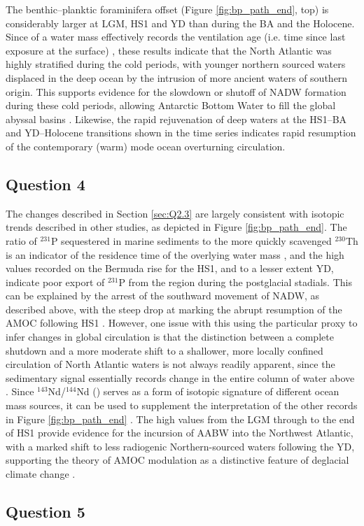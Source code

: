 The benthic--planktic foraminifera \fC{} offset (Figure \ref{fig:bp_path_end}, top) is considerably larger at LGM, HS1 and YD than during the BA and the Holocene.
Since \BP{} of a water mass effectively records the ventilation age (i.e. time since last exposure at the surface) \parencite{lynch2014tracers}, these results indicate that the North Atlantic was highly stratified during the cold periods, with younger northern sourced waters displaced in the deep ocean by the intrusion of more ancient waters of southern origin.
This supports evidence for the slowdown or shutoff of NADW formation during these cold periods, allowing Antarctic Bottom Water to fill the global abyssal basins \parencite{boyle1985comparison, bard1994north, thornalley2011deglacial}.
Likewise, the rapid rejuvenation of deep waters at the HS1--BA and YD--Holocene transitions shown in the \BP{} time series indicates rapid resumption of the contemporary (warm) mode ocean overturning circulation.

\subsection{Question 4}
\label{sec:Q2.4}
The \BP{} changes described in Section \ref{sec:Q2.3} are largely consistent with isotopic trends described in other studies, as depicted in Figure \ref{fig:bp_path_end}.
The ratio of $^{231}$P sequestered in marine sediments to the more quickly scavenged $^{230}$Th is an indicator of the residence time of the overlying water mass \parencite{lynch2014tracers}, and the high values recorded on the Bermuda rise for the HS1, and to a lesser extent YD, indicate poor export of $^{231}$P from the region during the postglacial stadials.
This can be explained by the arrest of the southward movement of NADW, as described above, with the steep \PaTh{} drop at  marking the abrupt resumption of the AMOC following HS1 \parencite{mcmanus2004collapse}.
However, one issue with this using the particular proxy to infer changes in global circulation is that the distinction between a complete shutdown and a more moderate shift to a shallower, more locally confined circulation of North Atlantic waters is not always readily apparent, since the sedimentary \PaTh{} signal essentially records change in the entire column of water above \parencite{roberts2010synchronous}. 
Since $^{143}$Nd/$^{144}$Nd (\eNd{}) serves as a form of isotopic signature of different ocean mass sources, it can be used to supplement the interpretation of the other records in Figure \ref{fig:bp_path_end} \parencite{lynch2014tracers}. 
The high values from the LGM through to the end of HS1 provide evidence for the incursion of AABW into the Northwest Atlantic, with a marked shift to less radiogenic Northern-sourced waters following the YD, supporting the theory of AMOC modulation as a distinctive feature of deglacial climate change \parencite{roberts2010synchronous}.

\subsection{Question 5}
\label{sec:Q2.5}

